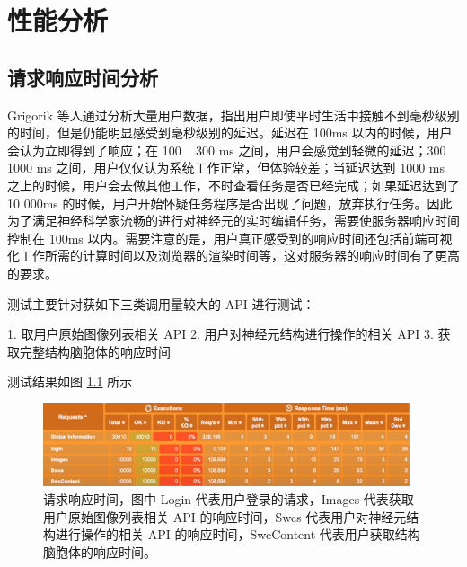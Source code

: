 \chapter{性能分析}

\section{请求响应时间分析}
Grigorik 等人通过分析大量用户数据，指出用户即使平时生活中接触不到毫秒级别的时间，但是仍能明显感受到毫秒级别的延迟。延迟在 100ms 以内的时候，用户会认为立即得到了响应；在 100 ~ 300 ms 之间，用户会感觉到轻微的延迟；300 ~ 1000 ms 之间，用户仅仅认为系统工作正常，但体验较差；当延迟达到 1000 ms 之上的时候，用户会去做其他工作，不时查看任务是否已经完成；如果延迟达到了 10 000ms 的时候，用户开始怀疑任务程序是否出现了问题，放弃执行任务。因此为了满足神经科学家流畅的进行对神经元的实时编辑任务，需要使服务器响应时间控制在 100ms 以内。需要注意的是，用户真正感受到的响应时间还包括前端可视化工作所需的计算时间以及浏览器的渲染时间等，这对服务器的响应时间有了更高的要求。

测试主要针对获如下三类调用量较大的 API 进行测试：

1. 取用户原始图像列表相关 API
2. 用户对神经元结构进行操作的相关 API
3. 获取完整结构脑胞体的响应时间

测试结果如图 \ref{response} 所示

\begin{figure}
\centering
\includegraphics[width=108mm]{images/response}
\caption{请求响应时间，图中 Login 代表用户登录的请求，Images 代表获取用户原始图像列表相关 API 的响应时间，Swcs 代表用户对神经元结构进行操作的相关 API 的响应时间，SwcContent 代表用户获取结构脑胞体的响应时间。}
\label{response}
\end{figure}
